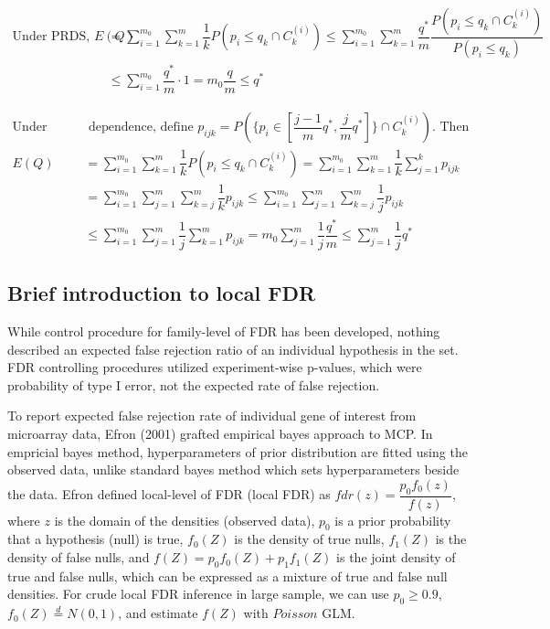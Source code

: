 \documentclass[a4paper, 11pt, oneside]{article}
\begin{document}
\begin{equation}
\begin{aligned}\label{proof-by2}
\text{Under PRDS, } E(Q)&=\sum_{i=1}^{m_0} \sum_{k=1}^m \dfrac{1}{k}P(p_i \leq q_k \cap C_k^{(i)}) \leq \sum_{i=1}^{m_0} \sum_{k=1}^m \dfrac{q^*}{m} \dfrac{P(p_i \leq q_k \cap C_k^{(i)})}{P(p_i \leq q_k)}\\
& \leq \sum_{i=1}^{m_0} \dfrac{q^*}{m} \cdot 1 = m_0 \dfrac{q}{m} \leq q^*
\end{aligned}
\end{equation}

\begin{equation}
\begin{aligned}\label{proof-by3}
\text{Under arbitraty} &\text{ dependence, define } p_{ijk}=P(\{ p_i \in [\dfrac{j-1}{m}q^*, \dfrac{j}{m}q^*]\} \cap C_k^{(i)}). \text{ Then}\\ 
E(Q)&=\sum_{i=1}^{m_0} \sum_{k=1}^m \dfrac{1}{k}P(p_i \leq q_k \cap C_k^{(i)}) = \sum_{i=1}^{m_0} \sum_{k=1}^{m} \dfrac{1}{k} \sum_{j=1}^{k} p_{ijk}\\
& = \sum_{i=1}^{m_0} \sum_{j=1}^{m} \sum_{k=j}^{m} \dfrac{1}{k}p_{ijk} \leq \sum_{i=1}^{m_0} \sum_{j=1}^{m} \sum_{k=j}^{m} \dfrac{1}{j}p_{ijk} \\
& \leq \sum_{i=1}^{m_0} \sum_{j=1}^{m} \dfrac{1}{j} \sum_{k=1}^{m} p_{ijk} = m_0 \sum_{j=1}^{m} \dfrac{1}{j} \dfrac{q^*}{m} \leq \sum_{j=1}^m \dfrac{1}{j} q^*
\end{aligned}
\end{equation}

\subsection{Brief introduction to local FDR}
While control procedure for family-level of FDR has been developed, nothing described an expected false rejection ratio of an individual hypothesis in the set. FDR controlling procedures utilized experiment-wise p-values, which were probability of type I error, not the expected rate of false rejection. \par
    To report expected false rejection rate of individual gene of interest from microarray data, Efron (2001) grafted empirical bayes approach to MCP. In empricial bayes method, hyperparameters of prior distribution are fitted using the observed data, unlike standard bayes method which sets hyperparameters beside the data. Efron defined local-level of FDR (local FDR) as $fdr(z)=\dfrac{p_0 f_0(z)}{f(z)}$, where $z$ is the domain of the densities (observed data), $p_0$ is a prior probability that a hypothesis (null) is true, $f_0(Z)$ is the density of true nulls, $f_1(Z)$ is the density of false nulls, and $f(Z)=p_0f_0(Z) + p_1f_1(Z)$ is the joint density of true and false nulls, which can be expressed as a mixture of true and false null densities. For crude local FDR inference in large sample, we can use $p_0 \geq 0.9$, $f_0(Z) \stackrel{d}{=} N(0, 1)$, and estimate $f(Z)$ with $Poisson$ GLM.
\end{document}
